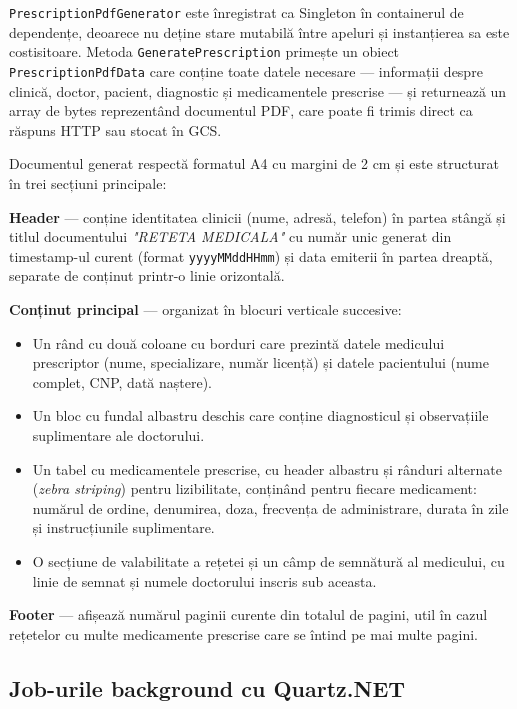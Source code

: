 \documentclass[12pt, a4paper]{report}
\begin{document}
\texttt{PrescriptionPdfGenerator} este înregistrat ca Singleton în
containerul de dependențe, deoarece nu deține stare mutabilă între apeluri și
instanțierea sa este costisitoare. Metoda \texttt{GeneratePrescription} primește
un obiect \texttt{PrescriptionPdfData} care conține toate datele necesare ---
informații despre clinică, doctor, pacient, diagnostic și medicamentele prescrise
--- și returnează un array de bytes reprezentând documentul PDF, care poate fi
trimis direct ca răspuns HTTP sau stocat în GCS.

Documentul generat respectă formatul A4 cu margini de 2 cm și este
structurat în trei secțiuni principale:

\textbf{Header} --- conține identitatea clinicii (nume, adresă, telefon) în
partea stângă și titlul documentului \textit{"RETETA MEDICALA"} cu număr unic
generat din timestamp-ul curent (format \texttt{yyyyMMddHHmm}) și data emiterii
în partea dreaptă, separate de conținut printr-o linie orizontală.

\textbf{Conținut principal} --- organizat în blocuri verticale succesive:

\begin{itemize}
    \item Un rând cu două coloane cu borduri care prezintă datele medicului
          prescriptor (nume, specializare, număr licență) și datele pacientului
          (nume complet, CNP, dată naștere).
    \item Un bloc cu fundal albastru deschis care conține diagnosticul și
          observațiile suplimentare ale doctorului.
    \item Un tabel cu medicamentele prescrise, cu header albastru și rânduri
          alternate (\textit{zebra striping}) pentru lizibilitate, conținând
          pentru fiecare medicament: numărul de ordine, denumirea, doza,
          frecvența de administrare, durata în zile și instrucțiunile
          suplimentare.
    \item O secțiune de valabilitate a rețetei și un câmp de semnătură al
          medicului, cu linie de semnat și numele doctorului inscris sub aceasta.
\end{itemize}

\textbf{Footer} --- afișează numărul paginii curente din totalul de pagini,
util în cazul rețetelor cu multe medicamente prescrise care se întind pe mai
multe pagini.



\subsection{Job-urile background cu Quartz.NET}
\end{document}

